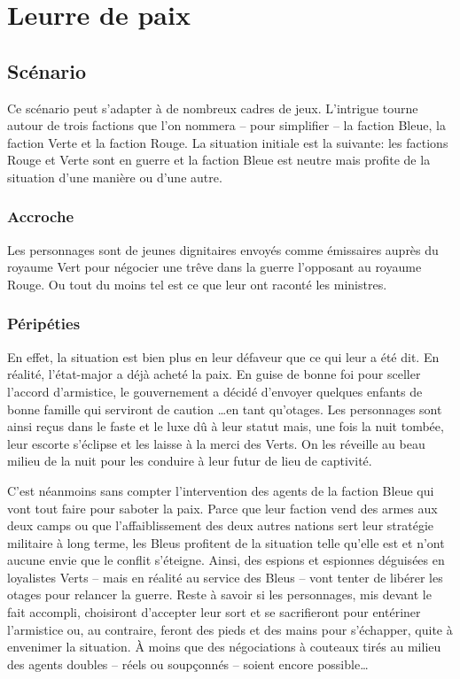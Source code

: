 \chapter{Leurre de paix}

\section{Scénario}

Ce scénario peut s'adapter à de nombreux cadres de jeux.
L'intrigue tourne autour de trois factions que l'on nommera -- pour simplifier -- la faction Bleue, la faction Verte et la faction Rouge.
La situation initiale est la suivante: les factions Rouge et Verte sont en guerre et la faction Bleue est \og neutre \fg mais profite de la situation d'une manière ou d'une autre.

\subsection{Accroche}

Les personnages sont de jeunes dignitaires envoyés comme émissaires auprès du royaume Vert pour négocier une trêve dans la guerre l'opposant au royaume Rouge.
Ou tout du moins tel est ce que leur ont raconté les ministres.

\subsection{Péripéties}

En effet, la situation est bien plus en leur défaveur que ce qui leur a été dit.
En réalité, l'état-major a déjà acheté la paix.
En guise de bonne foi pour sceller l'accord d'armistice, le gouvernement a décidé d'envoyer quelques enfants de bonne famille qui serviront de \og caution \fg\dots en tant qu'otages.
Les personnages sont ainsi reçus dans le faste et le luxe dû à leur statut mais, une fois la nuit tombée, leur escorte s'éclipse et les laisse à la merci des Verts.
On les réveille au beau milieu de la nuit pour les conduire à leur futur de lieu de captivité.

C'est néanmoins sans compter l'intervention des agents de la faction Bleue qui vont tout faire pour saboter la paix.
Parce que leur faction vend des armes aux deux camps ou que l'affaiblissement des deux autres nations sert leur stratégie militaire à long terme, les Bleus profitent de la situation telle qu'elle est et n'ont aucune envie que le conflit s'éteigne.
Ainsi, des espions et espionnes déguisées en loyalistes Verts -- mais en réalité au service des Bleus -- vont tenter de libérer les otages pour relancer la guerre.
Reste à savoir si les personnages, mis devant le fait accompli, choisiront d'accepter leur sort et se sacrifieront pour entériner l'armistice ou, au contraire, feront des pieds et des mains pour s'échapper, quite à envenimer la situation.
À moins que des négociations à couteaux tirés au milieu des agents doubles -- réels ou soupçonnés -- soient encore possible\dots

